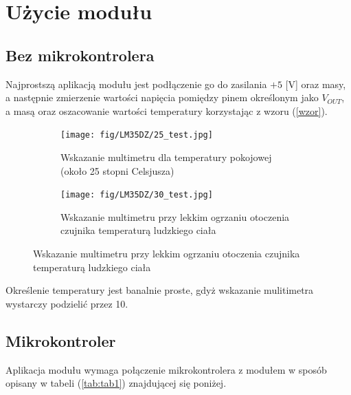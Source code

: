 \documentclass[11pt, a4paper]{article}
\begin{document}
\section{Użycie modułu}
\subsection{Bez mikrokontrolera}
Najprostszą aplikacją modułu jest podłączenie go do zasilania $+5$ [V] oraz masy, a następnie zmierzenie wartości napięcia pomiędzy pinem określonym jako $V_{OUT}$, a masą oraz oszacowanie wartości temperatury korzystając z wzoru (\ref{wzor}).

\vspace{0.5cm}
\vspace{0.25cm}
\begin{figure}[h]
\centering
\begin{subfigure}{.5\textwidth}
\centering
\texttt{[image: fig/LM35DZ/25\_test.jpg]}
\caption{\centering Wskazanie multimetru dla temperatury pokojowej (około 25 stopni Celsjusza)}
\label{fig:_uklad_woltomierz_otw}
\end{subfigure}%
\begin{subfigure}{.5\textwidth}
\centering
\texttt{[image: fig/LM35DZ/30\_test.jpg]}
\caption{\centering Wskazanie multimetru przy lekkim ogrzaniu otoczenia czujnika temperaturą ludzkiego ciała}
\label{fig:_uklad_woltomierz_zmk}
\end{subfigure}
\label{fig:woltomierz}
\end{figure}
\vspace{0.25cm}
Określenie temperatury jest banalnie proste, gdyż wskazanie mulitimetra wystarczy podzielić przez 10.
\vspace{0.5cm}
\subsection{Mikrokontroler}
Aplikacja modułu wymaga połączenie mikrokontrolera z modułem w sposób opisany w tabeli (\ref{tab:tab1}) znajdującej się poniżej.
\end{document}
